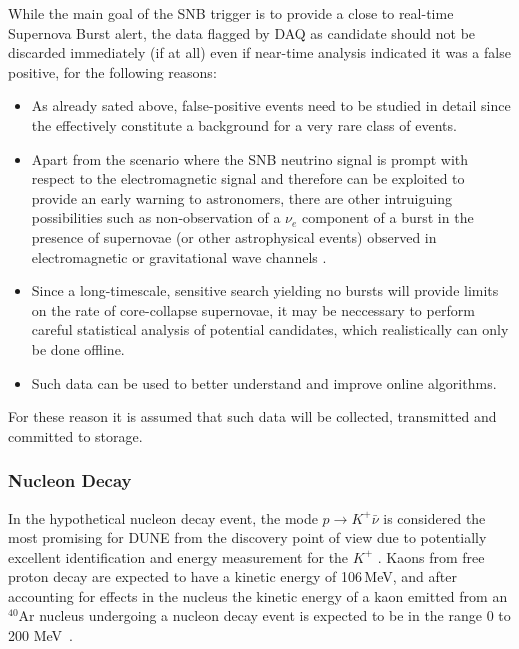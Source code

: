 While the main goal of the SNB trigger is to provide a close to real-time Supernova Burst alert, the data
flagged by DAQ as candidate should not be discarded immediately (if at all) even if near-time analysis indicated it was a false positive,
for the following reasons:
\begin{itemize}

\item As already sated above, false-positive events need to be studied in detail since the effectively constitute a
background for a very rare class of events.

\item Apart from the scenario where the SNB neutrino signal is prompt with respect to the electromagnetic signal
and therefore can be exploited to provide an early warning to astronomers, there are other intruiguing possibilities
such as non-observation of a $\nu_e$ component of a burst in the presence
of supernovae (or other astrophysical events) observed in electromagnetic or gravitational wave
channels \cite{cdr_vol2}.

\item Since a long-timescale, sensitive search yielding no bursts will provide limits on the rate of core-collapse
supernovae, it may be neccessary to perform careful statistical analysis of potential candidates, which realistically can only
be done offline.

\item Such data can be used to better understand and improve online algorithms.

\end{itemize}

For these reason it is assumed that such data will be collected, transmitted and committed to storage.

\subsubsection{Nucleon Decay}
\label{sec:pdk-data}
In the hypothetical nucleon decay event, the mode $p \rightarrow K^+\bar{\nu}$ is considered the most promising
for DUNE  from the discovery point of view due to potentially excellent  identification and energy measurement for the $K^+$ \cite{cdr_vol2}.
Kaons from free proton decay are expected to have a kinetic
energy of 106\,MeV, and after accounting for effects in the nucleus the kinetic energy of a kaon
emitted from an $^{40}$Ar nucleus undergoing a nucleon decay event is expected to be in the range
0 to 200 MeV~\cite{muon_bkgd_pdk}.

